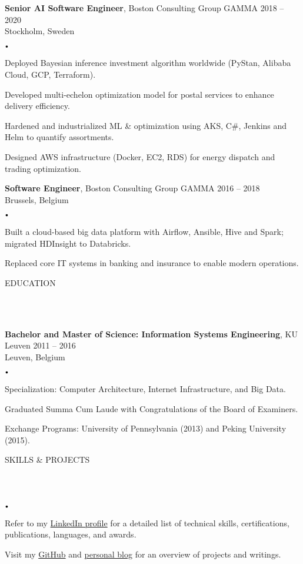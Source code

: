 \documentclass{article}
\newcommand{\header}[1]{
    {
        \hspace*{-4pt}
        \vspace*{8pt}
        \uppercase{#1}
    }
    \vspace*{-4pt} 
    \lineunder
    \vspace*{8pt}
}
\newcommand{\lineunder}{
    \vspace*{-8pt} \\ 
    \hspace*{-4pt} 
    \hrulefill \\
}
\newcommand{\experience}[5]{
    \vspace*{2pt}
    \textbf{#1}, #2 \hfill #3 \\ 
    #4 \\
    #5
    \vspace*{2pt}
}
\newcommand{\spacedbullet}{
    $\vcenter{\hbox{\tiny$\bullet$}}$\hspace*{-2pt}
}
\newenvironment{bulletlist}{
    \begin{list}
        {\spacedbullet}{\setlength\leftmargin{10pt} 
        \topsep 0pt \itemsep -2pt}}{\vspace*{4pt}
    \end{list}
}
\begin{document}
\experience{Senior AI Software Engineer}{Boston Consulting Group GAMMA}{2018 -- 2020}{Stockholm, Sweden}
{
    \begin{bulletlist}
        \item Deployed Bayesian inference investment algorithm worldwide (PyStan, Alibaba Cloud, GCP, Terraform).
        \item Developed multi-echelon optimization model for postal services to enhance delivery efficiency.
        \item Hardened and industrialized ML \& optimization using AKS, C\#, Jenkins and Helm to quantify assortments.
        \item Designed AWS infrastructure (Docker, EC2, RDS) for energy dispatch and trading optimization.
    \end{bulletlist}
}

\experience{Software Engineer}{Boston Consulting Group GAMMA}{2016 -- 2018}{Brussels, Belgium}
{
    \begin{bulletlist}
        \item Built a cloud-based big data platform with Airflow, Ansible, Hive and Spark; migrated HDInsight to Databricks.
        \item Replaced core IT systems in banking and insurance to enable modern operations.
    \end{bulletlist}
}

\vspace*{4pt}

\header{Education}
\experience{Bachelor and Master of Science: Information Systems Engineering}{KU Leuven}{2011 -- 2016}{Leuven, Belgium}
{
    \begin{bulletlist}
        \item Specialization: Computer Architecture, Internet Infrastructure, and Big Data.
        \item Graduated Summa Cum Laude with Congratulations of the Board of Examiners.
        \item Exchange Programs: University of Pennsylvania (2013) and Peking University (2015).
    \end{bulletlist}
}

\vspace*{4pt}
\header{Skills \& Projects}
\begin{bulletlist}
    \item Refer to my \href{https://linkedin.com/in/nielsdegrande/}{LinkedIn profile} for a detailed list of technical skills, certifications, publications, languages, and awards.
    \item Visit my \href{https://github.com/NielsDegrande/}{GitHub} and \href{https://niels.degran.de/blog}{personal blog} for an overview of projects and writings.
\end{bulletlist}
\end{document}
